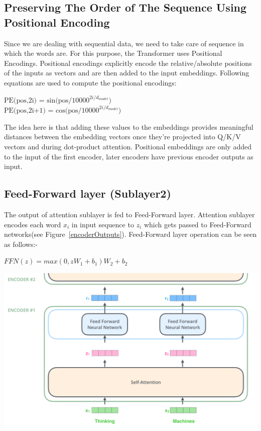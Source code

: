 \documentclass{article}
\begin{document}
\begin{multicols}{2}
\subsection{Preserving The Order of The Sequence Using Positional Encoding}
Since we are dealing with sequential data, we need to take care of sequence in which the words are. For this purpose, the Transformer uses Positional Encodings. Positional encodings explicitly encode the relative/absolute positions of the inputs as vectors and are then added to the input embeddings.
Following equations are used to compute the positional encodings:
\begin{center}
$\text{PE(pos,2i) = sin(pos/10000}^{2i/d_{model}})$\\
$\text{PE(pos,2i+1) = cos(pos/10000}^{2i/d_{model}})$
\end{center}
\noindent The idea here is that adding these values to the embeddings provides meaningful distances between the embedding vectors once they’re projected into Q/K/V vectors and during dot-product attention.
Positional embeddings are only added to the input of the first encoder, later encoders have previous encoder outputs as input.

\subsection{Feed-Forward layer (Sublayer2)}
The output of attention sublayer is fed to Feed-Forward layer. Attention sublayer encodes each word $x_i$ in input sequence to $z_i$ which gets passed to Feed-Forward networks(see Figure~\ref{encoderOutputs}). Feed-Forward layer operation can be seen as follows:- 

\begin{center}
$FFN(z) = max(0, zW_1 + b_1)W_2 + b_2$
\end{center}

\begin{center}
        \captionsetup{type=figure}
        \includegraphics[width=.40\textwidth]{encoderOutputs.png}
         \label{encoderOutputs} 
\end{center}


\end{multicols}
\end{document}
